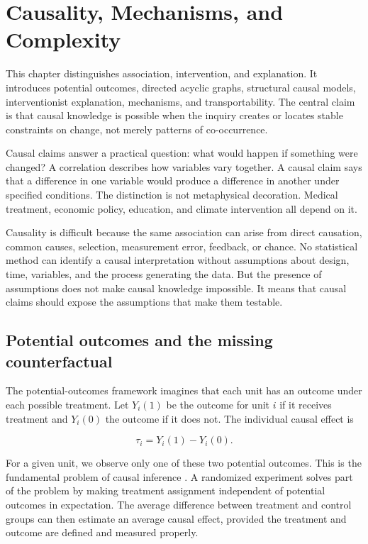 \chapter{Causality, Mechanisms, and Complexity}
\label{ch:causality}

\begin{chapterguide}
This chapter distinguishes association, intervention, and explanation. It
introduces potential outcomes, directed acyclic graphs, structural causal
models, interventionist explanation, mechanisms, and transportability. The
central claim is that causal knowledge is possible when the inquiry creates or
locates stable constraints on change, not merely patterns of co-occurrence.
\end{chapterguide}

Causal claims answer a practical question: what would happen if something were
changed? A correlation describes how variables vary together. A causal claim
says that a difference in one variable would produce a difference in another
under specified conditions. The distinction is not metaphysical decoration.
Medical treatment, economic policy, education, and climate intervention all
depend on it.

Causality is difficult because the same association can arise from direct
causation, common causes, selection, measurement error, feedback, or chance.
No statistical method can identify a causal interpretation without assumptions
about design, time, variables, and the process generating the data. But the
presence of assumptions does not make causal knowledge impossible. It means
that causal claims should expose the assumptions that make them testable.

\section{Potential outcomes and the missing counterfactual}

The potential-outcomes framework imagines that each unit has an outcome under
each possible treatment. Let \(Y_i(1)\) be the outcome for unit \(i\) if it
receives treatment and \(Y_i(0)\) the outcome if it does not. The individual
causal effect is

\[
  \tau_i = Y_i(1)-Y_i(0).
\]

For a given unit, we observe only one of these two potential outcomes. This is
the fundamental problem of causal inference \citep{rubin1974,holland1986}. A
randomized experiment solves part of the problem by making treatment assignment
independent of potential outcomes in expectation. The average difference
between treatment and control groups can then estimate an average causal
effect, provided the treatment and outcome are defined and measured properly.


